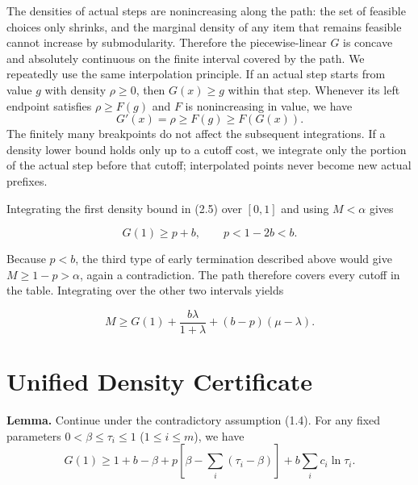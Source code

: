 \documentclass[11pt,a4paper]{article}
\begin{document}
The densities of actual steps are nonincreasing along the path: the set of feasible choices only shrinks, and the marginal density of any item that remains feasible cannot increase by submodularity. Therefore the piecewise-linear $G$ is concave and absolutely continuous on the finite interval covered by the path.
We repeatedly use the same interpolation principle. If an actual step starts from value $g$ with density $\rho\ge0$, then $G(x)\ge g$ within that step. Whenever its left endpoint satisfies $\rho\ge F(g)$ and $F$ is nonincreasing in value, we have
\[
G'(x)=\rho\ge F(g)\ge F(G(x)).
\]
The finitely many breakpoints do not affect the subsequent integrations. If a density lower bound holds only up to a cutoff cost, we integrate only the portion of the actual step before that cutoff; interpolated points never become new actual prefixes.

Integrating the first density bound in (2.5) over $[0,1]$ and using $M<\alpha$ gives

\begin{equation}
G(1)\ge p+b,\qquad p<1-2b<b.
\tag{2.6}
\end{equation}

Because $p<b$, the third type of early termination described above would give $M\ge1-p>\alpha$, again a contradiction. The path therefore covers every cutoff in the table. Integrating over the other two intervals yields

\begin{equation}
M\ge G(1)+\frac{b\lambda}{1+\lambda}+(b-p)(\mu-\lambda).
\tag{2.7}
\end{equation}

\section{Unified Density Certificate}

\textbf{Lemma.} Continue under the contradictory assumption (1.4). For any fixed parameters $0<\beta\le\tau_i\le1$ ($1\le i\le m$), we have
\begin{equation}
G(1)\ge1+b-\beta+
p\left[\beta-\sum_i(\tau_i-\beta)\right]
+b\sum_i c_i\ln\tau_i.
\tag{3.1}
\end{equation}
\end{document}
